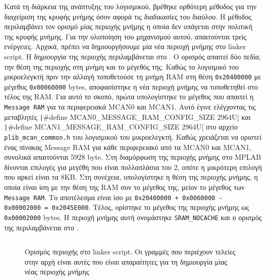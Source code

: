 \documentclass[a4paper,nobib,justified]{tufte-book}
\begin{document}
Κατά τη διάρκεια της ανάπτυξης του λογισμικού, βρέθηκε ορθότερη μέθοδος για την διαχείριση της κρυφής μνήμης όσον αφορά τις διαδικασίες του διαύλου. Η μέθοδος περιλαμβάνει τον ορισμό μίας περιοχής μνήμης η οποία δεν υπάγεται στην πολιτική της κρυφής μνήμης. Για την υλοποίηση του μηχανισμού αυτού, απαιτούνται τρείς ενέργειες. Αρχικά, πρέπει να δημιουργήσουμε μία νέα περιοχή μνήμης στο linker script. Η δημιουργία της περιοχής περιλαμβάνεται στο . Ο ορισμός απαιτεί δύο πεδία, την θέση της περιοχής στη μνήμη και το μέγεθός της. Καθώς το λογισμικό του μικροελεγκτή πριν την αλλαγή τοποθετούσε τη μνήμη RAM στη θέση \texttt{0x20400000} με μέγεθος \texttt{0x00060000} bytes, αποφασίστηκε η νέα περιοχή μνήμης να τοποθετηθεί στο τέλος της RAM. Για αυτό το σκοπό, πρώτα υπολογίστηκε το μέγεθος που απαιτεί η \texttt{Message RAM} για τα περιφερειακά MCAN0 και MCAN1. Αυτό έγινε ελέγχοντας τις μεταβλητές \texttt|#define MCAN0_MESSAGE_RAM_CONFIG_SIZE     2964U| και \texttt|#define MCAN1_MESSAGE_RAM_CONFIG_SIZE     2964U| στο αρχείο \texttt{plib\_mcan\_common.h} του λογισμικού του μικροελεγκτή. Καθώς χρειάζεται να οριστεί ένας πίνακας Message RAM για κάθε περιφερειακό από τα MCAN0 και MCAN1, συνολικά απαιτούνται 5928 byte. Στη διαμόρφωση της περιοχής μνήμης στο MPLAB δίνονται επιλογές για μεγέθη που είναι πολλαπλάσια του 2, οπότε η μικρότερη επιλογή που αρκεί είναι τα 8KB. Στη συνέχεια, υπολογίστηκε η θέση της περιοχής μνήμης, η οποία είναι ίση με την θέση της RAM συν το μέγεθος της, μείον το μέγεθος των \texttt{Message RAM}. Το αποτέλεσμα είναι ίσο με \texttt{0x20400000 + 0x0060000 - 0x00002000 = 0x2045E000}. Τέλος, ορίστηκε το μέγεθος της περιοχής μνήμης ως \texttt{0x00002000} bytes. Η περιοχή μνήμης αυτή ονομάστηκε \texttt{SRAM\_NOCACHE} και ο ορισμός της περιλαμβάνεται στο .


\begin{figure}
	\inputminted{c++}{code/examples/diff-linker.ld}
	\label{code:linker-diff}
	\caption[Ορισμός περιοχής στο linker script]{Ορισμός περιοχής στο linker script. Οι γραμμές που περιέχουν τελείες στην αρχή είναι αυτές που είναι απαραίτητες για τη δημιουργία μίας νέας περιοχής μνήμης}
\end{figure}
\end{document}
